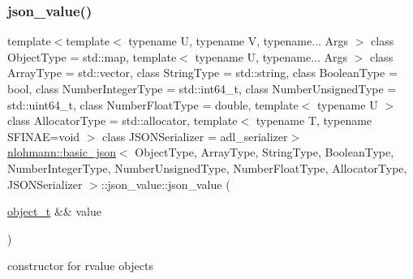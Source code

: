 \subsubsection{\texorpdfstring{json\+\_\+value()}{json\_value()}\hspace{0.1cm}{\footnotesize\ttfamily [10/12]}}
{\footnotesize\ttfamily template$<$template$<$ typename U, typename V, typename... Args $>$ class Object\+Type = std\+::map, template$<$ typename U, typename... Args $>$ class Array\+Type = std\+::vector, class String\+Type  = std\+::string, class Boolean\+Type  = bool, class Number\+Integer\+Type  = std\+::int64\+\_\+t, class Number\+Unsigned\+Type  = std\+::uint64\+\_\+t, class Number\+Float\+Type  = double, template$<$ typename U $>$ class Allocator\+Type = std\+::allocator, template$<$ typename T, typename S\+F\+I\+N\+A\+E=void $>$ class J\+S\+O\+N\+Serializer = adl\+\_\+serializer$>$ \\
\hyperlink{classnlohmann_1_1basic__json}{nlohmann\+::basic\+\_\+json}$<$ Object\+Type, Array\+Type, String\+Type, Boolean\+Type, Number\+Integer\+Type, Number\+Unsigned\+Type, Number\+Float\+Type, Allocator\+Type, J\+S\+O\+N\+Serializer $>$\+::json\+\_\+value\+::json\+\_\+value (\begin{DoxyParamCaption}\item[{\hyperlink{classnlohmann_1_1basic__json_a5e48a7893520e1314bf0c9723e26ea2a}{object\+\_\+t} \&\&}]{value }\end{DoxyParamCaption})\hspace{0.3cm}{\ttfamily [inline]}}



constructor for rvalue objects 

\mbox{\label{unionnlohmann_1_1basic__json_1_1json__value_a23a4858ed8fc824e5544edaf8a01a974}} 
